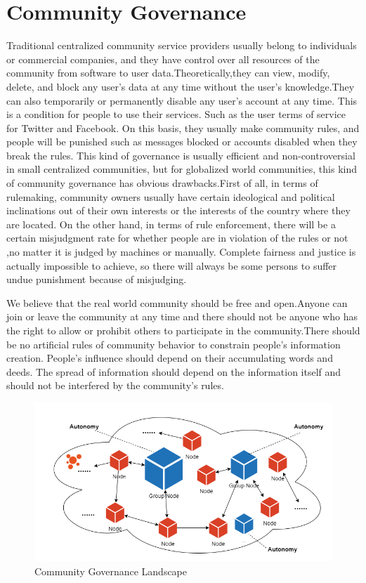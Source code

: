\documentclass{article}
\begin{document}
\section{Community Governance}
    Traditional centralized community service providers usually belong to individuals or commercial companies, and they have control over all resources of the community from software to user data.Theoretically,they can view, modify, delete, and block any user's data at any time without the user's knowledge.They can also temporarily or permanently disable any user's account at any time. This is a condition for people to use their services. Such as the user terms of service for Twitter\cite{twitter_tos} and Facebook\cite{facebook_tos}. On this basis, they usually make community rules, and people will be punished such as messages blocked or accounts disabled when they break the rules. This kind of governance is usually efficient and non-controversial in small centralized communities, but for globalized world communities, this kind of community governance has obvious drawbacks.First of all, in terms of rulemaking, community owners usually have certain ideological and political inclinations out of their own interests or the interests of the country where they are located. On the other hand, in terms of rule enforcement, there will be a certain misjudgment rate for whether people are in violation of the rules or not ,no matter it is judged by machines or manually. Complete fairness and justice is actually impossible to achieve, so there will always be some persons to suffer undue punishment because of misjudging.

    We believe that the real world community should be free and open.Anyone can join or leave the community at any time and there should not be anyone who has the right to allow or prohibit others to participate in the community.There should be no artificial rules of community behavior to constrain people's information creation. People's influence should depend on their accumulating words and deeds. The spread of information should depend on the information itself and should not be interfered by the community's rules.
    
    \begin{figure}[H]
        \centering
        \includegraphics[width=\textwidth]{figures-governance.png}
        \caption{Community Governance Landscape}
    \end{figure}
\end{document}
